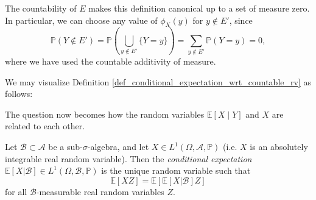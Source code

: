 \documentclass[12pt]{article}
\begin{document}
\begin{remark}
	The countability of $E$ makes this definition canonical up to a set of measure zero. In particular, we can choose any value of $\phi_X(y)$ for $y\not\in E'$, since 
	\begin{equation*}
		\mathbb{P}(Y \not\in E') = \mathbb{P}\left( \bigcup_{y\not\in E'} \{Y = y\} \right) =  \sum_{y\not\in E'} \mathbb{P}(Y=y) = 0,
	\end{equation*}
	where we have used the countable additivity of measure.
\end{remark}

\begin{remark}
	We may visualize Definition \ref{def_conditional_expectation_wrt_countable_rv} as follows:
	\begin{center}
	\end{center}
	The question now becomes how the random variables $\mathbb{E}[X \mid Y]$ and $X$ are related to each other.
\end{remark}

\begin{definition} %
	Let $\mathcal{B}\subset\mathcal{A}$ be a sub-$\sigma$-algebra, and let $X\in L^1(\Omega, \mathcal{A}, \mathbb{P})$ (i.e. $X$ is an absolutely integrable real random variable). Then the \emph{conditional expectation} $\mathbb{E}[X | \mathcal{B}] \in L^1(\Omega, \mathcal{B}, \mathbb{P})$ is the unique random variable such that
	\begin{equation*}
		\mathbb{E}[ XZ ] = \mathbb{E}[ \mathbb{E} [X|\mathcal{B}] Z]
	\end{equation*}
	for all $\mathcal{B}$-measurable real random variables $Z$.
\end{definition}
\end{document}
